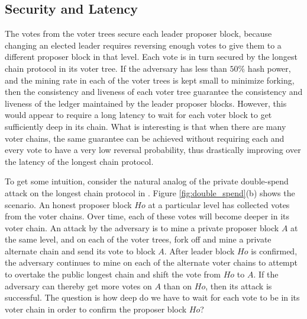 \fi

\subsection{Security and Latency}
\label{sec:prism-latency}


The votes from the voter trees secure each leader proposer block, because changing an elected leader requires reversing enough votes to give them to a different proposer block in that level. 
Each vote is in turn secured by the longest chain protocol in its voter tree. If the adversary has less than $50\%$ hash power, and the mining rate in each of the voter trees is kept small to minimize forking,  then the consistency and liveness of each voter tree guarantee the consistency and liveness of the ledger maintained by the leader proposer blocks. 
However, this would appear to require a long latency to wait for each voter block to get sufficiently deep in its chain. What is interesting is that when there are many voter chains, the same guarantee can be achieved without requiring each and every vote to have a very low reversal probability, thus drastically improving over the latency of the longest chain protocol. 


To get some intuition, consider the natural analog of the private double-spend attack on the longest chain protocol in \prism. Figure \ref{fig:double_spend}(b) shows the scenario. An honest proposer block $Ho$ at a particular level has collected votes from the voter chains. Over time, each of these votes will become deeper in its voter chain. An attack by the adversary is to mine a private proposer block $A$ at the same level, and on each of the voter trees, fork off and mine a private alternate chain and send its vote to block $A$. After leader block $Ho$ is confirmed, the adversary continues to mine on each of the alternate voter chains to attempt to overtake the public longest chain and shift the vote from $Ho$ to $A$. If the adversary can thereby get more votes on $A$ than on $Ho$, then its attack is successful. The question is how deep do we have to wait for each vote to be in its voter chain in order to confirm the proposer block $Ho$?

